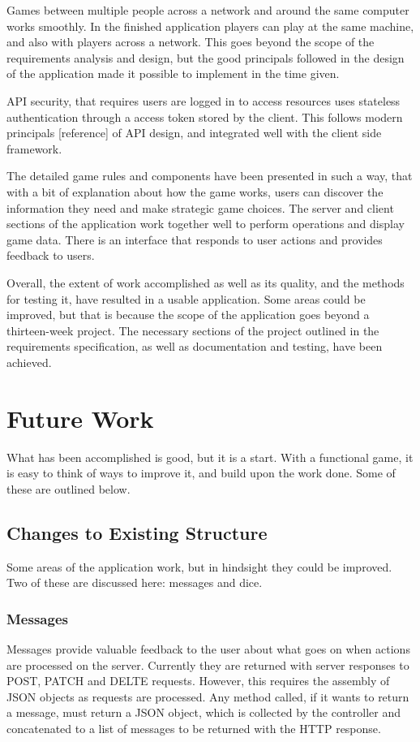 Games between multiple people across a network and around the same computer works smoothly. In the finished application players can play at the same machine, and also with players across a network. This goes beyond the scope of the requirements analysis and design, but the good principals followed in the design of the application made it possible to implement in the time given.

API security, that requires users are logged in to access resources uses stateless authentication through a access token stored by the client. This follows modern principals [reference] of API design, and integrated well with the client side framework.

The detailed game rules and components have been presented in such a way, that with a bit of explanation about how the game works, users can discover the information they need and make strategic game choices. The server and client sections of the application work together well to perform operations and display game data. There is an interface that responds to user actions and provides feedback to users.

Overall, the extent of work accomplished as well as its quality, and the methods for testing it, have resulted in a usable application. Some areas could be improved, but that is because the scope of the application goes beyond a thirteen-week project. The necessary sections of the project outlined in the requirements specification, as well as documentation and testing, have been achieved.

\section{Future Work}
What has been accomplished is good, but it is a start. With a functional game, it is easy to think of ways to improve it, and build upon the work done. Some of these are outlined below.

\subsection{Changes to Existing Structure}
Some areas of the application work, but in hindsight they could be improved. Two of these are discussed here: messages and dice.

\subsubsection{Messages}
Messages provide valuable feedback to the user about what goes on when actions are processed on the server. Currently they are returned with server responses to POST, PATCH and DELTE requests. However, this requires the assembly of JSON objects as requests are processed. Any method called, if it wants to return a message, must return a JSON object, which is collected by the controller and concatenated to a list of messages to be returned with the HTTP response.	

